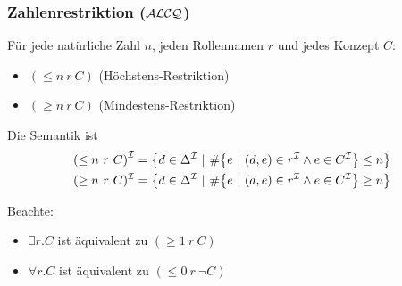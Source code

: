 \subsubsection{Zahlenrestriktion (\texorpdfstring{$\mathcal{A}\mathcal{L}\mathcal{C}\mathcal{Q}$}{ALCQ})}\label{zahlenrestriktion-alcq}

\begin{definition}[Zahlenrestriktion]
Für jede natürliche Zahl $n$, jeden Rollennamen $r$ und
jedes Konzept $C$:

\begin{itemize}
  \item $\left( \leq n\ r\ C \right)$ (Höchstens-Restriktion)
  \item $\left( \geq n\ r\ C \right)$ (Mindestens-Restriktion)
\end{itemize}

Die Semantik ist \begin{align*}
    \left( \leq n\ r\ C \right)^\MI &= \left\{ d \in \Delta^\MI\ |\ \#\left\{ e\ |\ \left( d,e \right) \in r^\MI \land e \in C^\MI \right\} \leq n \right\}\\
    ( \geq n\ r\ C)^\MI &= \left\{ d \in \Delta^\MI\ |\ \#\left\{ e\ |\ \left( d,e \right) \in r^\MI \land e \in C^\MI \right\} \geq n \right\}
\end{align*}
\end{definition}

\begin{tafel}[TODO]
\end{tafel}

Beachte:

\begin{itemize}
  \item $\exists r.C$ ist äquivalent zu $(\geq 1\ r\ C)$
  \item $\forall r.C$ ist äquivalent zu $(\leq 0\ r\ \neg C)$
\end{itemize}
